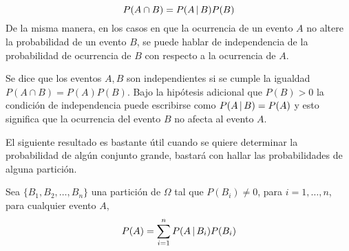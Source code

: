 $$P(A\cap B)=P(A\thinspace|\thinspace B)P(B)$$
De la misma manera, en los casos en que la
ocurrencia de un evento $A$ no altere la probabilidad de un evento $B$, se puede hablar de independencia de la probabilidad de ocurrencia de $B$ con respecto a la ocurrencia de $A$.
\begin{Def}
    Se dice que los eventos $A, B$ son independientes si se cumple la igualdad $P(A\cap B)=P(A)P(B)$. Bajo la hipótesis adicional que $P(B)>0$ la condición de independencia puede escribirse como $P(A\thinspace|\thinspace B)=P(A)$ y esto significa que la ocurrencia del evento $B$ no afecta al evento $A$.
\end{Def}
El siguiente resultado es bastante útil cuando se quiere determinar la probabilidad de algún conjunto grande, bastará con hallar las probabilidades de alguna partición.
\begin{Teo}
    Sea $\{B_1,B_2,\ldots,B_n\}$ una partición de $\Omega$ tal que $P(B_i)\not=0$, para  $i=1,\ldots,n$, para cualquier evento $A$, $$P(A)=\sum_{i=1}^n P(A\thinspace|\thinspace B_i)P(B_i)$$
\end{Teo}

